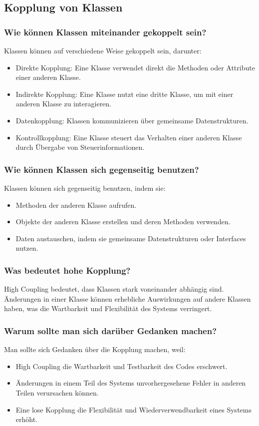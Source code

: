 \documentclass[main.tex]{subfiles}
\begin{document}
\subsection{\gls{Kopplung} von Klassen}
\subsubsection*{Wie können Klassen miteinander gekoppelt sein?}
Klassen können auf verschiedene Weise gekoppelt sein, darunter:
\begin{itemize}
    \item  \gls{Direkte Kopplung}: Eine Klasse verwendet direkt die Methoden oder Attribute einer anderen Klasse.
    \item  \gls{Indirekte Kopplung}: Eine Klasse nutzt eine dritte Klasse, um mit einer anderen Klasse zu interagieren.
    \item Datenkopplung: Klassen kommunizieren über gemeinsame Datenstrukturen.
    \item Kontrollkopplung: Eine Klasse steuert das Verhalten einer anderen Klasse durch Übergabe von Steuerinformationen.
\end{itemize}

\subsubsection*{Wie können Klassen sich gegenseitig benutzen?}
Klassen können sich gegenseitig benutzen, indem sie:
\begin{itemize}
    \item Methoden der anderen Klasse aufrufen.
    \item Objekte der anderen Klasse erstellen und deren Methoden verwenden.
    \item Daten austauschen, indem sie gemeinsame Datenstrukturen oder \glspl{Interface} nutzen.
\end{itemize}

\subsubsection*{Was bedeutet hohe Kopplung?}
 \gls{High Coupling} bedeutet, dass Klassen stark voneinander abhängig sind. Änderungen in einer Klasse können erhebliche Auswirkungen auf andere Klassen haben, was die Wartbarkeit und Flexibilität des Systems verringert.


\subsubsection*{Warum sollte man sich darüber Gedanken machen?}
Man sollte sich Gedanken über die \gls{Kopplung} machen, weil:
\begin{itemize}
    \item  \gls{High Coupling} die Wartbarkeit und Testbarkeit des Codes erschwert.
    \item Änderungen in einem Teil des Systems unvorhergesehene Fehler in anderen Teilen verursachen können.
    \item Eine lose \gls{Kopplung} die Flexibilität und Wiederverwendbarkeit eines Systems erhöht.
\end{itemize}
\end{document}
